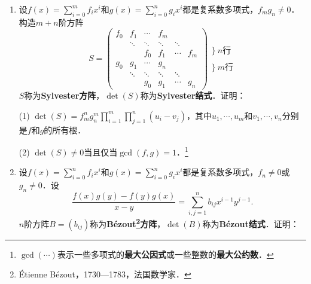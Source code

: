 \documentclass[a4paper,fontset=windows]{ctexbook}
\theoremstyle{definition}
\DeclareMathOperator{\tr}{tr}
\renewcommand{\le}{\leqslant}
\begin{document}
\begin{enumerate}
(3) \footnote{2019年IMO预选题A5．}$\sum\limits_{1\le i\le n}\prod\limits_{j\ne i}\dfrac{1-x_ix_j}{x_i-x_j}=\tr\Bigl(g_j(x_i)\Bigr)=\begin{cases}0,&\text{$n$是偶数；} \\ 1,&\text{$n$是奇数．}\end{cases}$

(4) 仿照以上思路证明$\sum\limits_{1\le i\le n}\prod\limits_{j\ne i}\dfrac{x_i+x_j}{x_i-x_j}=\begin{cases}0,&\text{$n$是偶数；} \\ 1,&\text{$n$是奇数．}\end{cases}$

\item 设$f(x)=\sum\limits_{i=0}^mf_ix^i$和$g(x)=\sum\limits_{i=0}^ng_ix^i$都是复系数多项式，$f_mg_n\ne 0$．构造$m+n$阶方阵
$$S=\begin{pmatrix}f_0&f_1&\cdots&f_m&& \\ &\ddots&\ddots&\ddots&\ddots& \\ &&f_0&f_1&\cdots&f_m \\ g_0&g_1&\cdots&g_n&& \\ &\ddots&\ddots&\ddots&\ddots& \\ &&g_0&g_1&\cdots&g_n\end{pmatrix}\begin{matrix}\Biggr\}~n\text{行} \\ ~ \\ \Biggr\}~m\text{行}\end{matrix}$$
$S$称为{\bf Sylvester方阵}，$\det(S)$称为{\bf Sylvester结式}．证明：

(1) $\det(S)=f_m^ng_n^m\prod\limits_{i=1}^m\prod\limits_{j=1}^n(u_i-v_j)$，其中$u_1,\cdots,u_m$和$v_1,\cdots,v_n$分别是$f$和$g$的所有根．

(2) $\det(S)\ne 0$当且仅当$\gcd(f,g)=1$．\footnote{$\gcd(\cdots)$表示一些多项式的{\bf 最大公因式}或一些整数的{\bf 最大公约数}．}

\item 设$f(x)=\sum\limits_{i=0}^nf_ix^i$和$g(x)=\sum\limits_{i=0}^ng_ix^i$都是复系数多项式，$f_n\ne 0$或$g_n\ne 0$．设
$$\frac{f(x)g(y)-f(y)g(x)}{x-y}=\sum_{i,j=1}^nb_{ij}x^{i-1}y^{j-1}.$$
$n$阶方阵$B=(b_{ij})$称为{\bf B\'ezout\footnote{\'Etienne B\'ezout，1730—1783，法国数学家．}方阵}，$\det(B)$称为{\bf B\'ezout结式}．证明：


\end{enumerate}
\end{document}
